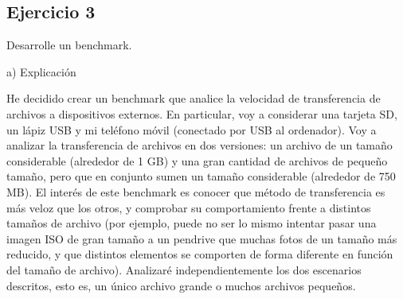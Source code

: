 \documentclass[a4paper, 11pt]{article} %
\begin{document}
\subsection{Ejercicio 3}
Desarrolle un benchmark. 

a) Explicación

He decidido crear un benchmark que analice la velocidad de transferencia de archivos a dispositivos externos. En particular, voy a considerar una tarjeta SD, un lápiz USB y mi teléfono móvil (conectado por USB al ordenador). Voy a analizar la transferencia de archivos en dos versiones: un archivo de un tamaño considerable (alrededor de 1 GB) y una gran cantidad de archivos de pequeño tamaño, pero que en conjunto sumen un tamaño considerable (alrededor de 750 MB). El interés de este benchmark es conocer que método de transferencia es más veloz que los otros, y comprobar su comportamiento frente a distintos tamaños de archivo (por ejemplo, puede no ser lo mismo intentar pasar una imagen ISO de gran tamaño a un pendrive que muchas fotos de un tamaño más reducido, y que distintos elementos se comporten de forma diferente en función del tamaño de archivo). Analizaré independientemente los dos escenarios descritos, esto es, un único archivo grande o muchos archivos pequeños.  
\end{document}
